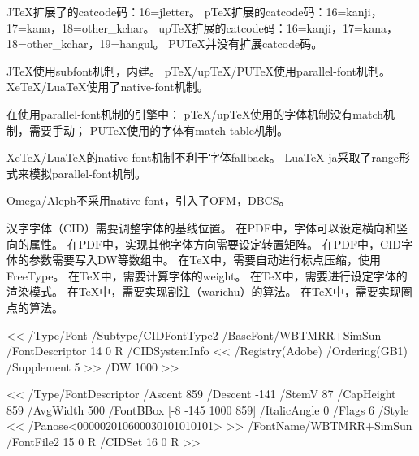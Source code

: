 JTeX扩展了的catcode码：16=jletter。
pTeX扩展的catcode码：16=kanji，17=kana，18=other_kchar。
upTeX扩展的catcode码：16=kanji，17=kana，18=other_kchar，19=hangul。
PUTeX并没有扩展catcode码。

JTeX使用subfont机制，内建。
pTeX/upTeX/PUTeX使用parallel-font机制。
XeTeX/LuaTeX使用了native-font机制。

在使用parallel-font机制的引擎中：
pTeX/upTeX使用的字体机制没有match机制，需要手动；
PUTeX使用的字体有match-table机制。

XeTeX/LuaTeX的native-font机制不利于字体fallback。
LuaTeX-ja采取了range形式来模拟parallel-font机制。

Omega/Aleph不采用native-font，引入了OFM，DBCS。

汉字字体（CID）需要调整字体的基线位置。
在PDF中，字体可以设定横向和竖向的属性。
在PDF中，实现其他字体方向需要设定转置矩阵。
在PDF中，CID字体的参数需要写入DW等数组中。
在TeX中，需要自动进行标点压缩，使用FreeType。
在TeX中，需要计算字体的weight。
在TeX中，需要进行设定字体的渲染模式。
在TeX中，需要实现割注（warichu）的算法。
在TeX中，需要实现圈点的算法。

<<
  /Type/Font
  /Subtype/CIDFontType2
  /BaseFont/WBTMRR+SimSun
  /FontDescriptor 14 0 R
  /CIDSystemInfo
  <<
    /Registry(Adobe)
    /Ordering(GB1)
    /Supplement 5
  >>
  /DW 1000
>>

<<
  /Type/FontDescriptor
  /Ascent 859
  /Descent -141
  /StemV 87
  /CapHeight 859
  /AvgWidth 500
  /FontBBox [-8 -145 1000 859]
  /ItalicAngle 0
  /Flags 6
  /Style
  <<
    /Panose<000002010600030101010101>
  >>
  /FontName/WBTMRR+SimSun
  /FontFile2 15 0 R
  /CIDSet 16 0 R
>>
\bye

